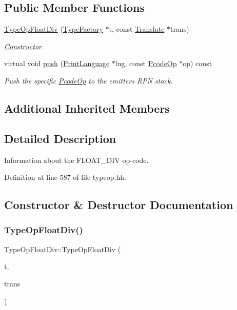 \subsection*{Public Member Functions}
\begin{DoxyCompactItemize}
\item 
\mbox{\hyperlink{class_type_op_float_div_a18932c43f8cbdd73c8b9f163c905d2f6}{Type\+Op\+Float\+Div}} (\mbox{\hyperlink{class_type_factory}{Type\+Factory}} $\ast$t, const \mbox{\hyperlink{class_translate}{Translate}} $\ast$trans)
\begin{DoxyCompactList}\small\item\em \mbox{\hyperlink{class_constructor}{Constructor}}. \end{DoxyCompactList}\item 
virtual void \mbox{\hyperlink{class_type_op_float_div_a50164a276228622cf6232d2bfc310356}{push}} (\mbox{\hyperlink{class_print_language}{Print\+Language}} $\ast$lng, const \mbox{\hyperlink{class_pcode_op}{Pcode\+Op}} $\ast$op) const
\begin{DoxyCompactList}\small\item\em Push the specific \mbox{\hyperlink{class_pcode_op}{Pcode\+Op}} to the emitter\textquotesingle{}s R\+PN stack. \end{DoxyCompactList}\end{DoxyCompactItemize}
\subsection*{Additional Inherited Members}


\subsection{Detailed Description}
Information about the F\+L\+O\+A\+T\+\_\+\+D\+IV op-\/code. 

Definition at line 587 of file typeop.\+hh.



\subsection{Constructor \& Destructor Documentation}
\mbox{\label{class_type_op_float_div_a18932c43f8cbdd73c8b9f163c905d2f6}} 
\subsubsection{\texorpdfstring{TypeOpFloatDiv()}{TypeOpFloatDiv()}}
{\footnotesize\ttfamily Type\+Op\+Float\+Div\+::\+Type\+Op\+Float\+Div (\begin{DoxyParamCaption}\item[{\mbox{\hyperlink{class_type_factory}{Type\+Factory}} $\ast$}]{t,  }\item[{const \mbox{\hyperlink{class_translate}{Translate}} $\ast$}]{trans }\end{DoxyParamCaption})}



